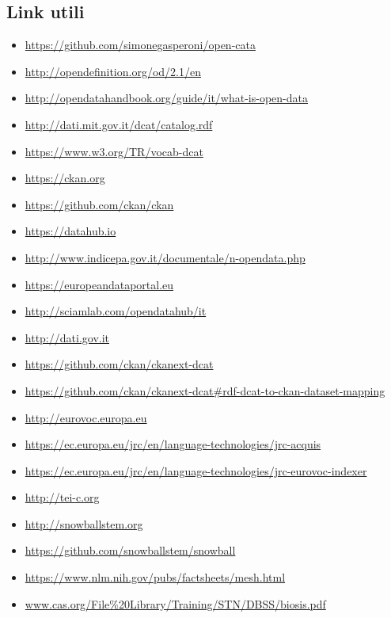 \documentclass{article}
\theoremstyle{plain}
\theoremstyle{definition}
\begin{document}
\subsection{Link utili}
\begin{itemize}
\item \url{https://github.com/simonegasperoni/open-cata}
\item \url{http://opendefinition.org/od/2.1/en}
\item \url{http://opendatahandbook.org/guide/it/what-is-open-data}
\item \url{http://dati.mit.gov.it/dcat/catalog.rdf}
\item \url{https://www.w3.org/TR/vocab-dcat}
\item \url{https://ckan.org}
\item \url{https://github.com/ckan/ckan}
\item \url{https://datahub.io}
\item \url{http://www.indicepa.gov.it/documentale/n-opendata.php}
\item \url{https://europeandataportal.eu}
\item \url{http://sciamlab.com/opendatahub/it}
\item \url{http://dati.gov.it}
\item \url{https://github.com/ckan/ckanext-dcat}
\item \url{https://github.com/ckan/ckanext-dcat#rdf-dcat-to-ckan-dataset-mapping}
\item \url{http://eurovoc.europa.eu}
\item \url{https://ec.europa.eu/jrc/en/language-technologies/jrc-acquis}
\item \url{https://ec.europa.eu/jrc/en/language-technologies/jrc-eurovoc-indexer}
\item \url{http://tei-c.org}
\item \url{http://snowballstem.org}
\item \url{https://github.com/snowballstem/snowball}
\item \url{https://www.nlm.nih.gov/pubs/factsheets/mesh.html}
\item \url{www.cas.org/File%20Library/Training/STN/DBSS/biosis.pdf}
\end{itemize}
\end{document}
